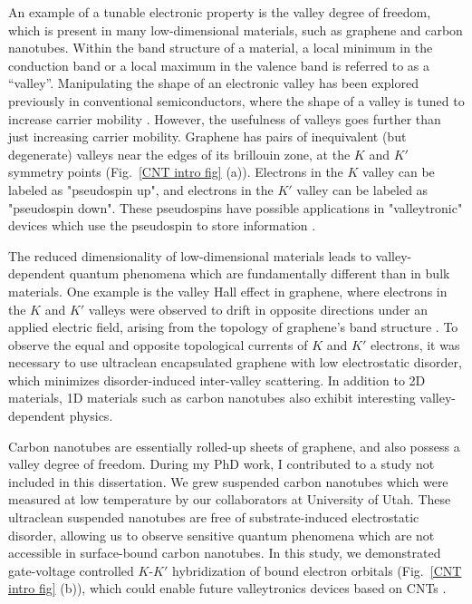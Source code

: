 \documentclass{beavtex_dub_edit}
\begin{document}
An example of a tunable electronic property is the valley degree of freedom, which is present in many low-dimensional materials, such as graphene and carbon nanotubes. Within the band structure of a material, a local minimum in the conduction band or a local maximum in the valence band is referred to as a “valley”. Manipulating the shape of an electronic valley has been explored previously in conventional semiconductors, where the shape of a valley is tuned to increase carrier mobility \cite{thompson_90-nm_2004}. However, the usefulness of valleys goes further than just increasing carrier mobility. Graphene has pairs of inequivalent (but degenerate) valleys near the edges of its brillouin zone, at the $K$ and $K'$ symmetry points (Fig.\ \ref{CNT intro fig} (a)). Electrons in the $K$ valley can be labeled as "pseudospin up", and electrons in the $K'$ valley can be labeled as "pseudospin down". These pseudospins have possible applications in "valleytronic" devices which use the pseudospin to store information \cite{schaibley_valleytronics_2016}. 

The reduced dimensionality of low-dimensional materials leads to valley-dependent quantum phenomena which are fundamentally different than in bulk materials. One example is the valley Hall effect in graphene, where electrons in the $K$ and $K'$ valleys were observed to drift in opposite directions under an applied electric field, arising from the topology of graphene's band structure \cite{gorbachev_detecting_2014}. To observe the equal and opposite topological currents of $K$ and $K'$ electrons, it was necessary to use ultraclean encapsulated graphene with low electrostatic disorder, which minimizes disorder-induced inter-valley scattering. In addition to 2D materials, 1D materials such as carbon nanotubes also exhibit interesting valley-dependent physics. 

Carbon nanotubes are essentially rolled-up sheets of graphene, and also possess a valley degree of freedom. During my PhD work, I contributed to a study not included in this dissertation. We grew suspended carbon nanotubes which were measured at low temperature by our collaborators at University of Utah. These ultraclean suspended nanotubes are free of substrate-induced electrostatic disorder, allowing us to observe sensitive quantum phenomena which are not accessible in surface-bound carbon nanotubes. In this study, we demonstrated gate-voltage controlled $K$-$K'$ hybridization of bound electron orbitals (Fig.\ \ref{CNT intro fig} (b)), which could enable future valleytronics devices based on CNTs \cite{berg_vernier_2024}. 
\end{document}
